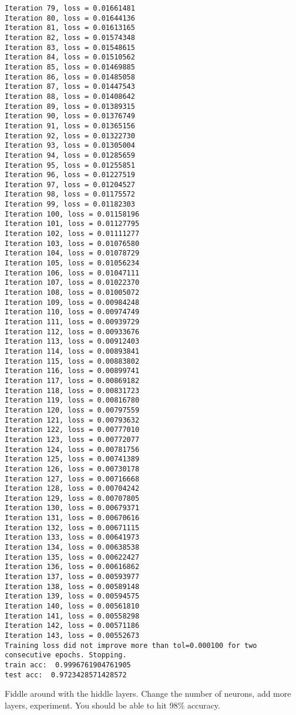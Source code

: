 \documentclass[11pt]{article}
\begin{document}
\begin{Verbatim}[commandchars=\\\{\}]
Iteration 79, loss = 0.01661481
Iteration 80, loss = 0.01644136
Iteration 81, loss = 0.01613165
Iteration 82, loss = 0.01574348
Iteration 83, loss = 0.01548615
Iteration 84, loss = 0.01510562
Iteration 85, loss = 0.01469885
Iteration 86, loss = 0.01485058
Iteration 87, loss = 0.01447543
Iteration 88, loss = 0.01408642
Iteration 89, loss = 0.01389315
Iteration 90, loss = 0.01376749
Iteration 91, loss = 0.01365156
Iteration 92, loss = 0.01322730
Iteration 93, loss = 0.01305004
Iteration 94, loss = 0.01285659
Iteration 95, loss = 0.01255851
Iteration 96, loss = 0.01227519
Iteration 97, loss = 0.01204527
Iteration 98, loss = 0.01175572
Iteration 99, loss = 0.01182303
Iteration 100, loss = 0.01158196
Iteration 101, loss = 0.01127795
Iteration 102, loss = 0.01111277
Iteration 103, loss = 0.01076580
Iteration 104, loss = 0.01078729
Iteration 105, loss = 0.01056234
Iteration 106, loss = 0.01047111
Iteration 107, loss = 0.01022370
Iteration 108, loss = 0.01005072
Iteration 109, loss = 0.00984248
Iteration 110, loss = 0.00974749
Iteration 111, loss = 0.00939729
Iteration 112, loss = 0.00933676
Iteration 113, loss = 0.00912403
Iteration 114, loss = 0.00893841
Iteration 115, loss = 0.00883802
Iteration 116, loss = 0.00899741
Iteration 117, loss = 0.00869182
Iteration 118, loss = 0.00831723
Iteration 119, loss = 0.00816780
Iteration 120, loss = 0.00797559
Iteration 121, loss = 0.00793632
Iteration 122, loss = 0.00777010
Iteration 123, loss = 0.00772077
Iteration 124, loss = 0.00781756
Iteration 125, loss = 0.00741389
Iteration 126, loss = 0.00730178
Iteration 127, loss = 0.00716668
Iteration 128, loss = 0.00704242
Iteration 129, loss = 0.00707805
Iteration 130, loss = 0.00679371
Iteration 131, loss = 0.00670616
Iteration 132, loss = 0.00671115
Iteration 133, loss = 0.00641973
Iteration 134, loss = 0.00638538
Iteration 135, loss = 0.00622427
Iteration 136, loss = 0.00616862
Iteration 137, loss = 0.00593977
Iteration 138, loss = 0.00589148
Iteration 139, loss = 0.00594575
Iteration 140, loss = 0.00561810
Iteration 141, loss = 0.00558298
Iteration 142, loss = 0.00571186
Iteration 143, loss = 0.00552673
Training loss did not improve more than tol=0.000100 for two consecutive epochs. Stopping.
train acc:  0.9996761904761905
test acc:  0.9723428571428572

    \end{Verbatim}

    Fiddle around with the hiddle layers. Change the number of neurons, add
more layers, experiment. You should be able to hit 98\% accuracy.
\end{document}
